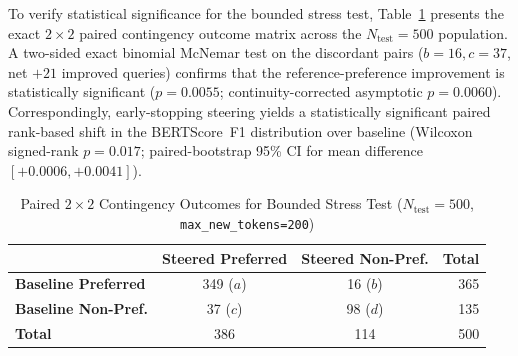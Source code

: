 \documentclass[conference]{IEEEtran}
\begin{document}
\begin{table}[htbp]
\caption{BERTScore Reference-Preference Evaluation ($N_{\text{test}}=500$, \texttt{max\_new\_tokens=200})}
\label{tab:clinical_safety}
\centering
{}
\end{table}

To verify statistical significance for the bounded stress test, Table~\ref{tab:mcnemar_bounded} presents the exact $2\times 2$ paired contingency outcome matrix across the $N_{\text{test}}=500$ population. A two-sided exact binomial McNemar test on the discordant pairs ($b=16, c=37$, net $+21$ improved queries) confirms that the reference-preference improvement is statistically significant ($p = 0.0055$; continuity-corrected asymptotic $p = 0.0060$). Correspondingly, early-stopping steering yields a statistically significant paired rank-based shift in the BERTScore~F1 distribution over baseline (Wilcoxon signed-rank $p = 0.017$; paired-bootstrap 95\% CI for mean difference $[+0.0006, +0.0041]$).

\begin{table}[htbp]
\caption{Paired $2\times 2$ Contingency Outcomes for Bounded Stress Test ($N_{\text{test}}=500$, \texttt{max\_new\_tokens=200})}
\label{tab:mcnemar_bounded}
\centering
\setlength{\tabcolsep}{4pt}
\begin{tabular}{lccr}
\toprule
& \textbf{Steered Preferred} & \textbf{Steered Non-Pref.} & \textbf{Total} \\
\midrule
\textbf{Baseline Preferred} & 349 ($a$) & 16 ($b$) & 365 \\
\textbf{Baseline Non-Pref.} & 37 ($c$) & 98 ($d$) & 135 \\
\midrule
\textbf{Total} & 386 & 114 & 500 \\
\bottomrule
\end{tabular}
\end{table}
\end{document}
